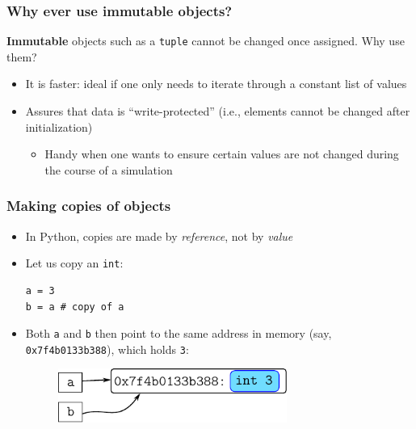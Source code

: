 \documentclass[xcolor=table]{beamer}
\begin{document}
\begin{frame}[fragile]
\frametitle{Why ever use immutable objects?}

    \textbf{Immutable} objects such as a \texttt{tuple} cannot be changed once assigned. Why use them?
    \pause
\begin{itemize}
    \item It is faster: ideal if one only needs to iterate through a constant list of values
        \pause
    \item Assures that data is ``write-protected'' (i.e., elements cannot be changed after initialization)
        \begin{itemize}
            \item Handy when one wants to ensure certain values are not changed during the course of a simulation
        \end{itemize}
\end{itemize}

\end{frame}
\begin{frame}[fragile]
\frametitle{Making copies of objects}
    \begin{itemize} 
        \item In Python, copies are made by \emph{reference}, not by \emph{value} 
            \pause 
        \item Let us copy an \texttt{int}:
\begin{lstlisting}[style=python,belowskip=-0.8\baselineskip]
a = 3
b = a # copy of a
\end{lstlisting} \pause
        \item Both \texttt{a} and \texttt{b} then point to the same address in memory (say, \texttt{0x7f4b0133b388}), which holds \texttt{3}: 
            \begin{figure}\centering%
                \vspace{1ex}%
                \includegraphics[width = 75mm]{variable_assignment1.pdf}
            \end{figure}
    \end{itemize} 

\end{frame}
\end{document}
